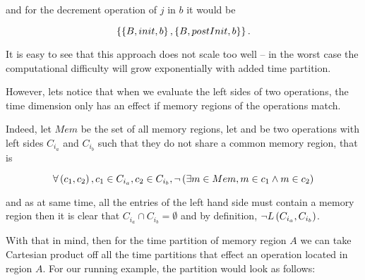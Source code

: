 \documentclass[..thesis.tex]{subfiles}
\begin{document}
and for the decrement operation of $j$ in $b$ it would be

\begin{equation*}
\left\lbrace \left\lbrace B, init, b \right\rbrace, \left\lbrace B, postInit, b \right\rbrace \right\rbrace \text{.}
\end{equation*}


It is easy to see that this approach does not scale too well -- in the worst case the computational difficulty will grow exponentially with added time partition.


However, lets notice that when we evaluate the left sides of two operations, the time dimension only has an effect if memory regions of the operations match. 

Indeed, let $Mem$ be the set of all memory regions, let  and  be two operations with left sides $C_{i_{a}}$ and $C_{i_{b}}$ such that they do not share a common memory region,
that is

\begin{equation*}
\forall \left( c_1, c_2 \right), c_1 \in C_{i_a} , c_2 \in C_{i_b} , \lnot \left( \exists m \in Mem,  m \in c_1 \land m \in c_2 \right)
\end{equation*} 


and as at same time, all the entries of the left hand side must contain a memory region then it is clear that $C_{i_{a}} \cap C_{i_{b}} = \emptyset$ and by definition,
$\lnot L \left( C_{i_{a}}, C_{i_{b}} \right) $. 

With that in mind, then for the time partition of memory region $A$ we can take Cartesian product off all the time partitions that effect an operation located in region $A$.
For our running example, the partition would look as follows:
\end{document}
